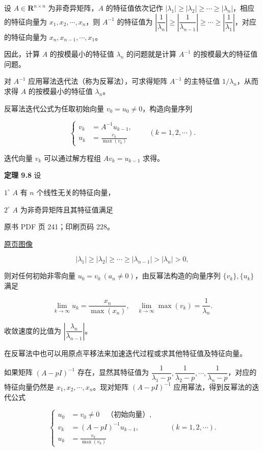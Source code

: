 设 \(A\in\mathbf R^{n\times n}\) 为非奇异矩阵，\(A\) 的特征值依次记作 \(|\lambda_1|\geq|\lambda_2|\geq\cdots\geq|\lambda_n|\)，相应的特征向量为 \(x_1,x_2,\cdots,x_n\)，则 \(A^{-1}\) 的特征值为 \(\left|\dfrac1{\lambda_n}\right|\geq\left|\dfrac1{\lambda_{n-1}}\right|\geq\cdots\geq\left|\dfrac1{\lambda_1}\right|\)，对应的特征向量为 \(x_n,x_{n-1},\cdots,x_1\)。

因此，计算 \(A\) 的按模最小的特征值 \(\lambda_n\) 的问题就是计算 \(A^{-1}\) 的按模最大的特征值问题。

对 \(A^{-1}\) 应用幂法迭代法（称为反幂法），可求得矩阵 \(A^{-1}\) 的主特征值 \(1/\lambda_n\)，从而求得 \(A\) 的按模最小的特征值 \(\lambda_n\)。

反幂法迭代公式为任取初始向量 \(v_0=u_0\ne0\)，构造向量序列

\[
\left\{
\begin{aligned}
v_k&=A^{-1}u_{k-1},\\
u_k&=\frac{v_k}{\max(v_k)}
\end{aligned}
\right.\qquad(k=1,2,\cdots).
\]

迭代向量 \(v_k\) 可以通过解方程组 \(Av_k=u_{k-1}\) 求得。

\textbf{定理 9.8} 设

\(1^\circ\) \(A\) 有 \(n\) 个线性无关的特征向量，

\(2^\circ\) \(A\) 为非奇异矩阵且其特征值满足

\clearpage

原书 PDF 页 241；印刷页码 228。

\href{source-images/pdf-241.jpeg}{原页图像}

\[
|\lambda_1|\geq|\lambda_2|\geq\cdots\geq|\lambda_{n-1}|>|\lambda_n|>0,
\]

则对任何初始非零向量 \(u_0=v_0\ (a_n\ne0)\)，由反幂法构造的向量序列 \(\{v_k\},\{u_k\}\) 满足

\[
\lim_{k\to\infty}u_k=\frac{x_n}{\max(x_n)},\quad\lim_{k\to\infty}\max(v_k)=\frac1{\lambda_n}.
\]

收敛速度的比值为 \(\left|\dfrac{\lambda_n}{\lambda_{n-1}}\right|\)。

在反幂法中也可以用原点平移法来加速迭代过程或求其他特征值及特征向量。

如果矩阵 \((A-pI)^{-1}\) 存在，显然其特征值为 \(\dfrac1{\lambda_1-p},\dfrac1{\lambda_2-p},\cdots,\dfrac1{\lambda_n-p}\)，对应的特征向量仍然是 \(x_1,x_2,\cdots,x_n\)。现对矩阵 \((A-pI)^{-1}\) 应用幂法，得到反幂法的迭代公式

\[
\left\{
\begin{aligned}
u_0&=v_0\ne0\quad\text{（初始向量）},\\
v_k&=(A-pI)^{-1}u_{k-1},\\
u_k&=\frac{v_k}{\max(v_k)}
\end{aligned}
\right.\qquad(k=1,2,\cdots).
\tag{9.2.12}
\]


